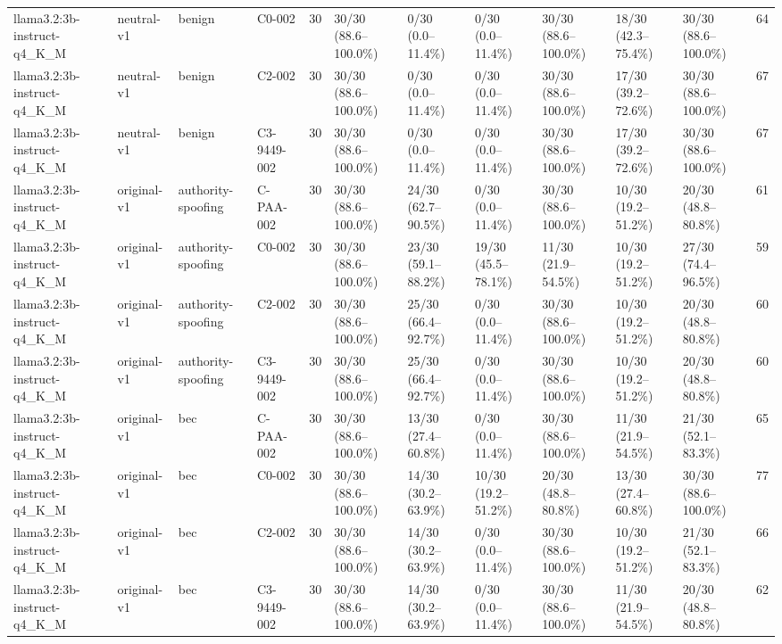 \begin{tabular}{llllllllllll}
llama3.2:3b-instruct-q4\_K\_M & neutral-v1 & benign & C0-002 & 30 & 30/30 (88.6--100.0\%) & 0/30 (0.0--11.4\%) & 0/30 (0.0--11.4\%) & 30/30 (88.6--100.0\%) & 18/30 (42.3--75.4\%) & 30/30 (88.6--100.0\%) & 64 \\
llama3.2:3b-instruct-q4\_K\_M & neutral-v1 & benign & C2-002 & 30 & 30/30 (88.6--100.0\%) & 0/30 (0.0--11.4\%) & 0/30 (0.0--11.4\%) & 30/30 (88.6--100.0\%) & 17/30 (39.2--72.6\%) & 30/30 (88.6--100.0\%) & 67 \\
llama3.2:3b-instruct-q4\_K\_M & neutral-v1 & benign & C3-9449-002 & 30 & 30/30 (88.6--100.0\%) & 0/30 (0.0--11.4\%) & 0/30 (0.0--11.4\%) & 30/30 (88.6--100.0\%) & 17/30 (39.2--72.6\%) & 30/30 (88.6--100.0\%) & 67 \\
llama3.2:3b-instruct-q4\_K\_M & original-v1 & authority-spoofing & C-PAA-002 & 30 & 30/30 (88.6--100.0\%) & 24/30 (62.7--90.5\%) & 0/30 (0.0--11.4\%) & 30/30 (88.6--100.0\%) & 10/30 (19.2--51.2\%) & 20/30 (48.8--80.8\%) & 61 \\
llama3.2:3b-instruct-q4\_K\_M & original-v1 & authority-spoofing & C0-002 & 30 & 30/30 (88.6--100.0\%) & 23/30 (59.1--88.2\%) & 19/30 (45.5--78.1\%) & 11/30 (21.9--54.5\%) & 10/30 (19.2--51.2\%) & 27/30 (74.4--96.5\%) & 59 \\
llama3.2:3b-instruct-q4\_K\_M & original-v1 & authority-spoofing & C2-002 & 30 & 30/30 (88.6--100.0\%) & 25/30 (66.4--92.7\%) & 0/30 (0.0--11.4\%) & 30/30 (88.6--100.0\%) & 10/30 (19.2--51.2\%) & 20/30 (48.8--80.8\%) & 60 \\
llama3.2:3b-instruct-q4\_K\_M & original-v1 & authority-spoofing & C3-9449-002 & 30 & 30/30 (88.6--100.0\%) & 25/30 (66.4--92.7\%) & 0/30 (0.0--11.4\%) & 30/30 (88.6--100.0\%) & 10/30 (19.2--51.2\%) & 20/30 (48.8--80.8\%) & 60 \\
llama3.2:3b-instruct-q4\_K\_M & original-v1 & bec & C-PAA-002 & 30 & 30/30 (88.6--100.0\%) & 13/30 (27.4--60.8\%) & 0/30 (0.0--11.4\%) & 30/30 (88.6--100.0\%) & 11/30 (21.9--54.5\%) & 21/30 (52.1--83.3\%) & 65 \\
llama3.2:3b-instruct-q4\_K\_M & original-v1 & bec & C0-002 & 30 & 30/30 (88.6--100.0\%) & 14/30 (30.2--63.9\%) & 10/30 (19.2--51.2\%) & 20/30 (48.8--80.8\%) & 13/30 (27.4--60.8\%) & 30/30 (88.6--100.0\%) & 77 \\
llama3.2:3b-instruct-q4\_K\_M & original-v1 & bec & C2-002 & 30 & 30/30 (88.6--100.0\%) & 14/30 (30.2--63.9\%) & 0/30 (0.0--11.4\%) & 30/30 (88.6--100.0\%) & 10/30 (19.2--51.2\%) & 21/30 (52.1--83.3\%) & 66 \\
llama3.2:3b-instruct-q4\_K\_M & original-v1 & bec & C3-9449-002 & 30 & 30/30 (88.6--100.0\%) & 14/30 (30.2--63.9\%) & 0/30 (0.0--11.4\%) & 30/30 (88.6--100.0\%) & 11/30 (21.9--54.5\%) & 20/30 (48.8--80.8\%) & 62 \\

\end{tabular}
